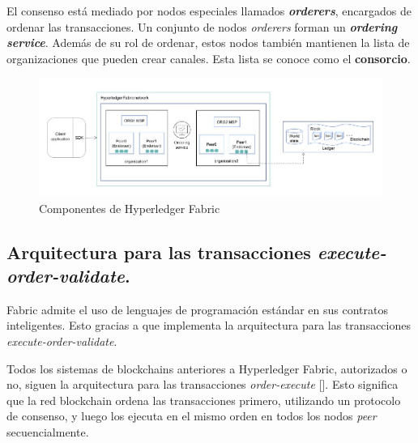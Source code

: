 El consenso está mediado por nodos especiales llamados \textit{\textbf{orderers}}, encargados de ordenar las transacciones. Un conjunto de nodos \textit{orderers} forman un \textbf{\textit{ordering service}}. Además de su rol de ordenar, estos nodos también mantienen la lista de organizaciones que pueden crear canales. Esta lista se conoce como el \textbf{consorcio}.


\begin{figure}[tbph]
\centering
\includegraphics[width=\textwidth]{Images/hlf_components}
\caption{Componentes de Hyperledger Fabric}
\label{fig:hlfcomponents}
\end{figure}


\subsection*{Arquitectura para las transacciones \textit{execute-order-validate}.}

Fabric admite el uso de lenguajes de programación estándar en sus contratos inteligentes. Esto gracias a que implementa la arquitectura para las transacciones \textit{execute-order-validate}.


Todos los sistemas de blockchains anteriores a Hyperledger Fabric, autorizados o no, siguen la arquitectura para las transacciones \textit{order-execute} [\cite{hlf-paper}]. Esto significa que la red blockchain ordena las transacciones primero, utilizando un protocolo de consenso, y luego los ejecuta en el mismo orden en todos los nodos \textit{peer} secuencialmente.

